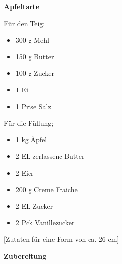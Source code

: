 

\parindent0pt	

\pagestyle{empty}


\textbf{\LARGE{Apfeltarte}}%

\hrulefill
\vspace*{\fill}
\begin{multicols}{2}	

Für den Teig:
\begin{itemize}
\item 300 g Mehl
\item 150 g Butter
\item 100 g Zucker
\item 1 Ei
\item 1 Prise Salz
\end{itemize}

Für die Füllung;
\begin{itemize}
\item 1 kg Äpfel
\item 2 EL zerlassene Butter
\item 2 Eier
\item 200 g Creme Fraiche
\item 2 EL Zucker
\item 2 Pck Vanillezucker
\end{itemize}
\end{multicols}
\vfill									%

\vspace{2cm}
%
\begin{center}
%
[Zutaten für  eine Form von ca. 26 cm]%
\end{center}



\vfill
\newpage
\textbf{{\LARGE Zubereitung}}%

\hrulefill

